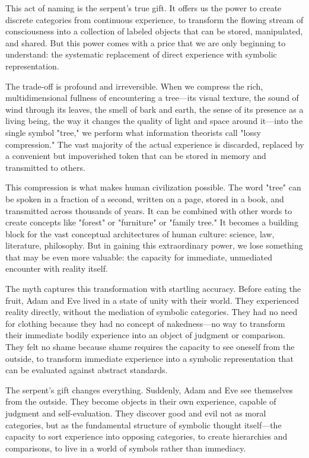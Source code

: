 This act of naming is the serpent's true gift. It offers us the power to create discrete categories from continuous experience, to transform the flowing stream of consciousness into a collection of labeled objects that can be stored, manipulated, and shared. But this power comes with a price that we are only beginning to understand: the systematic replacement of direct experience with symbolic representation.

The trade-off is profound and irreversible. When we compress the rich, multidimensional fullness of encountering a tree—its visual texture, the sound of wind through its leaves, the smell of bark and earth, the sense of its presence as a living being, the way it changes the quality of light and space around it—into the single symbol "tree," we perform what information theorists call "lossy compression." The vast majority of the actual experience is discarded, replaced by a convenient but impoverished token that can be stored in memory and transmitted to others.

This compression is what makes human civilization possible. The word "tree" can be spoken in a fraction of a second, written on a page, stored in a book, and transmitted across thousands of years. It can be combined with other words to create concepts like "forest" or "furniture" or "family tree." It becomes a building block for the vast conceptual architectures of human culture: science, law, literature, philosophy. But in gaining this extraordinary power, we lose something that may be even more valuable: the capacity for immediate, unmediated encounter with reality itself.

The myth captures this transformation with startling accuracy. Before eating the fruit, Adam and Eve lived in a state of unity with their world. They experienced reality directly, without the mediation of symbolic categories. They had no need for clothing because they had no concept of nakedness—no way to transform their immediate bodily experience into an object of judgment or comparison. They felt no shame because shame requires the capacity to see oneself from the outside, to transform immediate experience into a symbolic representation that can be evaluated against abstract standards.

The serpent's gift changes everything. Suddenly, Adam and Eve see themselves from the outside. They become objects in their own experience, capable of judgment and self-evaluation. They discover good and evil not as moral categories, but as the fundamental structure of symbolic thought itself—the capacity to sort experience into opposing categories, to create hierarchies and comparisons, to live in a world of symbols rather than immediacy.

